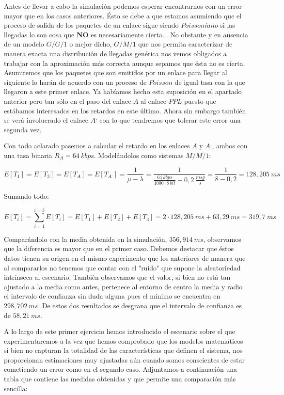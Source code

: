 \documentclass{article}[10pt]
\begin{document}
		Antes de llevar a cabo la simulación podemos esperar encontrarnos con un error mayor que en los casos anteriores. Ésto se debe a que estamos asumiendo que el proceso de salida de los paquetes de un enlace sigue siendo $Poissoniano$ si las llegadas lo son cosa que \textbf{NO} es necesariamente cierta... No obstante y en ausencia de un modelo $G/G/1$ o mejor dicho, $G/M/1$ que nos permita caracterizar de manera exacta una distribución de llegadas genérica nos vemos obligados a trabajar con la aproximación más correcta aunque sepamos que ésta no es cierta. Asumiremos que los paquetes que son emitidos por un enlace para llegar al siguiente lo harán de acuerdo con un proceso de $Poisson$ de igual tasa con la que llegaron a este primer enlace. Ya habíamos hecho esta suposición en el apartado anterior pero tan sólo en el paso del enlace $A$ al enlace $PPL$ puesto que estábamos interesados en los retardos en este último. Ahora sin embargo también se verá involucrado el enlace $A^,$ con lo que tendremos que tolerar este error una segunda vez.

		Con todo aclarado pasemos a calcular el retardo en los enlaces $A$ y $A^,$, ambos con una tasa binaria $R_A = 64\ kbps$. Modelándolos como sistemas $M/M/1$:

		$$E[T_1] = E[T_3] = E[T_A] = E[T_{A^,}] = \frac{1}{\mu - \lambda} = \frac{1}{\frac{64\ kbps}{1000 \cdot 8\ bit} - 0,2\ \frac{msg}{s}} = \frac{1}{8 - 0,2} = 128,205\ ms$$

		Sumando todo:

		$$E[T_t] = \sum_{i = 1}^{i = 3}E[T_i] = E[T_1] + E[T_2] + E[T_3] = 2 \cdot 128,205\ ms + 63,29\ ms = 319,7\ ms$$

		Comparándolo con la media obtenida en la simulación, $356,914\ ms$, observamos que la diferencia es mayor que en el primer caso. Debemos destacar que éstos datos tienen su origen en el mismo experimento que los anteriores de manera que al compararlos no tenemos que contar con el "ruido" que supone la aleatoriedad intrínseca al escenario. También observamos que el valor, si bien no está tan ajustado a la media como antes, pertenece al entorno de centro la media y radio el intervalo de confianza sin duda alguna pues el mínimo se encuentra en $298,702\ ms$. De estos dos resultados se desgrana que el intervalo de confianza es de $58,21\ ms$.

		A lo largo de este primer ejercicio hemos introducido el escenario sobre el que experimentaremos a la vez que hemos comprobado que los modelos matemáticos si bien no capturan la totalidad de las características que definen el sistema, nos proporcionan estimaciones muy ajustadas aún cuando somos conscientes de estar cometiendo un error como en el segundo caso. Adjuntamos a continuación una tabla que contiene las medidas obtenidas y que permite una comparación más sencilla:
\end{document}
